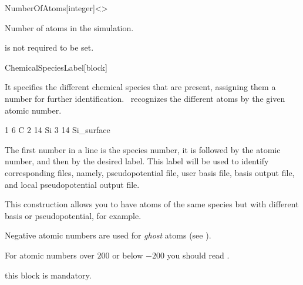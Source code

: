 \begin{fdfentry}{NumberOfAtoms}[integer]<>

  Number of atoms in the simulation.

  \note is not required to be set.

\end{fdfentry}


\begin{fdfentry}{ChemicalSpeciesLabel}[block]

  It specifies the different chemical species that are
  present, assigning them a number for further identification.
  \siesta\ recognizes the different atoms by the given atomic number.

  \begin{fdfexample}
        1   6   C
        2  14   Si
        3  14   Si_surface
  \end{fdfexample}
  The first number in a line is the species number, it is followed by
  the atomic number, and then by the desired label. This label will be
  used to identify corresponding files, namely, pseudopotential file,
  user basis file, basis output file, and local pseudopotential output
  file.

  This construction allows you to have atoms of the same species but
  with different basis or pseudopotential, for example.

  Negative atomic numbers are used for \emph{ghost}
  atoms (see ).

  For atomic numbers over $200$ or below $-200$ you should read .

  \note this block is mandatory.
  
\end{fdfentry}


